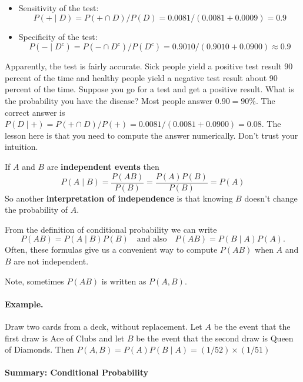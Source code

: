 \documentclass[
  14pt,
]{memoir}
\begin{document}
\begin{itemize}
\item Sensitivity of the test:
$$P(+\mid D)=P(+\cap D) / P(D)=0.0081 /(0.0081+0.0009)=0.9$$ 
\item Specificity of the test: 
$$P(-\mid D^{c})=P(-\cap D^{c}) / P(D^{c})=0.9010/(0.9010+0.0900)\approx 0.9$$
\end{itemize}

Apparently, the test is fairly accurate. Sick people yield a positive test result 90 percent of the time and healthy people yield a negative test result about 90 percent of the time. Suppose you go for a test and get a positive result. What is the probability you have the disease? Most people answer \(0.90=90\%\). The correct answer is \(P(D \mid+)=P(+\cap D) / P(+)=0.0081 /(0.0081+0.0900)=0.08\). The lesson here is that you need to compute the answer numerically. Don't trust your intuition.

\bigskip

If \(A\) and \(B\) are \textbf{independent events} then
\[
P(A \mid B)=\frac{P(A B)}{P(B)}=\frac{P(A) P(B)}{P(B)}=P(A)
\]
So another \textbf{interpretation of independence} is that knowing \(B\) doesn't change the probability of \(A\).

\bigskip

From the definition of conditional probability we can write
\[
P(A B)=P(A \mid B) P(B)\quad\text{and also}\quad P(A B)=P(B \mid A) P(A).
\]
Often, these formulas give us a convenient way to compute \(P(A B)\) when \(A\) and \(B\) are not independent.

\bigskip

Note, sometimes \(P(A B)\) is written as \(P(A,B)\).

\bigskip

\paragraph*{Example.}

Draw two cards from a deck, without replacement. Let \(A\) be the event that the first draw is Ace of Clubs and let \(B\) be the event that the second draw is Queen of Diamonds. Then \(P(A, B)=P(A) P(B \mid A)=(1 / 52) \times(1 / 51)\)

\bigskip

\paragraph*{Summary: Conditional Probability}
\vspace{-.3cm}
\end{document}
